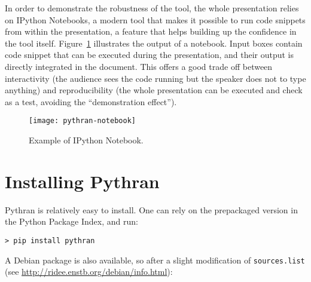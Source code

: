 \documentclass{llncs}
\begin{document}
In order to demonstrate the robustness of the tool, the whole presentation
relies on IPython Notebooks, a modern tool that makes it possible to
run code snippets from within the presentation, a feature that helps building
up the confidence in the tool itself. Figure~\ref{fig:notebook} illustrates the
output of a notebook. Input boxes contain code snippet that can be executed
during the presentation, and their output is directly integrated in the
document. This offers a good trade off between interactivity (the audience sees
the code running but the speaker does not to type anything) and reproducibility
(the whole presentation can be executed and check as a test, avoiding the
``demonstration effect'').

\begin{figure}
    \vspace{-1em}
    \texttt{[image: pythran-notebook]}
    \caption{Example of IPython Notebook.}
    \label{fig:notebook}
    \vspace{-1em}
\end{figure}

%
%
%

\section*{Installing Pythran}
\label{sec:install}

Pythran is relatively easy to install. One can rely on the prepackaged version in the Python Package Index, and run:

\begin{lstlisting}
> pip install pythran
\end{lstlisting}

A Debian package is also available, so after a slight modification of \texttt{sources.list} (see \url{http://ridee.enstb.org/debian/info.html}):
\end{document}
